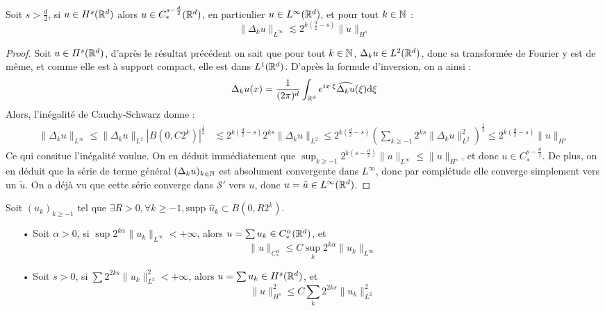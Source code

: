\documentclass[11pt,a4paper]{article}
\begin{document}
\begin{lemma}\label{inject}
Soit $s>\frac{d}{2}$, si $u\in H^s(\mathbb R^d)$ alors $u\in C^{s-\frac{d}{2}}_*(\mathbb R^d)$, en particulier $u\in L^\infty(\mathbb R^d)$, et pour tout $k\in \mathbb N$ :
\begin{equation*}
\|\Delta_ku\|_{L^\infty} \lesssim 2^{k(\frac{d}{2}-s)} \|u\|_{H^s}
\end{equation*}
\end{lemma}


\begin{proof}
Soit $u\in H^s(\mathbb R^d)$, d'après le résultat précédent on sait que pour tout $k\in \mathbb N$, $\Delta_ku\in L^2(\mathbb R^d)$, donc sa transformée de Fourier y est de même, et comme elle est à support compact, elle est dans $L^1(\mathbb R^d)$. D'après la formule d'inversion, on a ainsi : 
\begin{equation*}
\Delta_ku(x) = \frac{1}{(2\pi)^d}\int_{\mathbb R^d} e^{i x\cdot \xi} \widehat{\Delta_ku}(\xi)\mathrm{d}\xi
\end{equation*}
Alors, l'inégalité de Cauchy-Schwarz donne :
\begin{align*}
\|\Delta_ku\|_{L^\infty} \leq \|\Delta_ku\|_{L^2} \left|B(0,C 2^k) \right| ^\frac{1}{2} &\lesssim 2^{k(\frac{d}{2}-s)} 2^{ks}\|\Delta_ku\|_{L^2} \leq 2^{k(\frac{d}{2}-s)} (\sum_{k\geq -1} 2^{ks}\|\Delta_ku\|^2_{L^2})^{\frac{1}{2}} \leq 2^{k(\frac{d}{2}-s)} \|u\|_{H^s}
\end{align*}
Ce qui consitue l'inégalité voulue. On en déduit immédiatement que $\sup_{k \geq -1} 2^{k({s-\frac{d}{2}})}\|u\|_{L^\infty} \leq \|u\|_{H^s}$, et donc $u\in C^{{s-\frac{d}{2}}}_*$. De plus, on en déduit que la série de terme général $(\Delta_ku)_{k\in \mathbb N}$ est absolument convergente dans $L^\infty$, donc par complétude elle converge simplement vers un $\tilde{u}$. On a déjà vu que cette série converge dans $\mathcal{S}'$ vers $u$, donc $u=\tilde{u} \in L^\infty(\mathbb R^d)$.
\end{proof}


\begin{prop}\label{spec_ball}
Soit $(u_k)_{k\geq -1}$ tel que $\exists R >0, \forall k\geq -1, \text{supp }\hat{u}_k \subset B(0,R2^k)$. \\
\begin{itemize}
\item[•]Soit $\alpha >0$, si $\sup 2^{k\alpha}\|u_k\|_{L^\infty} < +\infty$, alors $u=\sum u_k \in C^\alpha_*(\mathbb R^d)$, et 
\begin{equation*}
\|u\|_{C^\alpha_*} \leq C\sup_k 2^{k\alpha}\|u_k\|_{L^\infty}
\end{equation*}
\item[•]Soit $s >0$, si $\sum 2^{2ks}\|u_k\|^2_{L^2} < +\infty$, alors $u=\sum u_k \in H^s(\mathbb R^d)$, et 
\begin{equation*}
\|u\|_{H^s}^2 \leq C\sum_k 2^{2ks}\|u_k\|^2_{L^2} 
\end{equation*}
\end{itemize}
\end{prop}
\end{document}

